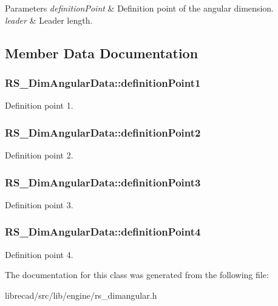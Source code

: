 \begin{DoxyParams}{Parameters}
{\em definition\-Point} & Definition point of the angular dimension. \\
\hline
{\em leader} & Leader length. \\
\hline
\end{DoxyParams}


\subsection{Member Data Documentation}
\hypertarget{classRS__DimAngularData_afbf81b527fc17d9eced33a5dcbedd6b3}{
\subsubsection[{definition\-Point1}]{ R\-S\-\_\-\-Dim\-Angular\-Data\-::definition\-Point1}}\label{classRS__DimAngularData_afbf81b527fc17d9eced33a5dcbedd6b3}
Definition point 1. \hypertarget{classRS__DimAngularData_a5479ca00f3595dd586e5d981e1c93759}{
\subsubsection[{definition\-Point2}]{ R\-S\-\_\-\-Dim\-Angular\-Data\-::definition\-Point2}}\label{classRS__DimAngularData_a5479ca00f3595dd586e5d981e1c93759}
Definition point 2. \hypertarget{classRS__DimAngularData_ab9bbe7a23004d2d9c2180f53335ed94f}{
\subsubsection[{definition\-Point3}]{ R\-S\-\_\-\-Dim\-Angular\-Data\-::definition\-Point3}}\label{classRS__DimAngularData_ab9bbe7a23004d2d9c2180f53335ed94f}
Definition point 3. \hypertarget{classRS__DimAngularData_acad6d7ce39a18977e21e771033e6b780}{
\subsubsection[{definition\-Point4}]{ R\-S\-\_\-\-Dim\-Angular\-Data\-::definition\-Point4}}\label{classRS__DimAngularData_acad6d7ce39a18977e21e771033e6b780}
Definition point 4. 

The documentation for this class was generated from the following file\-:\begin{DoxyCompactItemize}
\item 
librecad/src/lib/engine/rs\-\_\-dimangular.\-h\end{DoxyCompactItemize}
